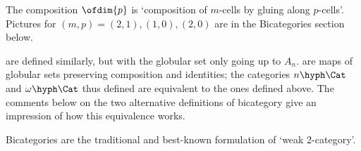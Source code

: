 The composition $\ofdim{p}$ is `composition of $m$-cells by gluing along
$p$-cells'.  Pictures for $(m,p) = (2,1), (1,0), (2,0)$ are in the
Bicategories section below. 

 are defined similarly, but with the globular
set only going up to $A_n$.   are
maps of globular sets preserving composition and identities; the categories
$n\hyph\Cat$ and $\omega\hyph\Cat$ thus defined are equivalent to the ones
defined above.  The comments below on the two alternative definitions of
bicategory give an impression of how this equivalence works. 

\clearpage





Bicategories are the traditional and best-known formulation of `weak
2-category'.  

